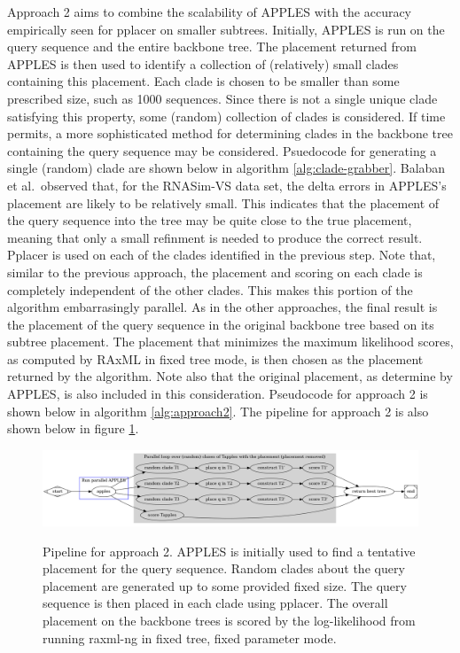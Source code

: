 \documentclass[10pt]{article}
\begin{document}
Approach 2 aims to combine the scalability of APPLES with the accuracy
empirically seen for pplacer on smaller subtrees. Initially, APPLES is
run on the query sequence and the entire backbone tree. The placement
returned from APPLES is then used to identify a collection of
(relatively) small clades containing this placement. Each clade is
chosen to be smaller than some prescribed size, such as 1000 sequences.
Since there is not a single unique clade satisfying this property, some
(random) collection of clades is considered. If time permits, a more
sophisticated method for determining clades in the backbone tree
containing the query sequence may be considered. Psuedocode for
generating a single (random) clade are shown below in algorithm
\ref{alg:clade-grabber}. Balaban et al.~observed that, for the RNASim-VS
data set, the delta errors in APPLES's placement are likely to be
relatively small. This indicates that the placement of the query
sequence into the tree may be quite close to the true placement, meaning
that only a small refinment is needed to produce the correct result.
Pplacer is used on each of the clades identified in the previous step.
Note that, similar to the previous approach, the placement and scoring
on each clade is completely independent of the other clades. This makes
this portion of the algorithm embarrasingly parallel. As in the other
approaches, the final result is the placement of the query sequence in
the original backbone tree based on its subtree placement. The placement
that minimizes the maximum likelihood scores, as computed by RAxML in
fixed tree mode, is then chosen as the placement returned by the
algorithm. Note also that the original placement, as determine by
APPLES, is also included in this consideration. Pseudocode for approach
2 is shown below in algorithm \ref{alg:approach2}.
The pipeline for approach 2 is also shown below in figure \ref{fig:approach2-pipeline}.

\begin{figure}[h]
\centering
\includegraphics[width=\textwidth]{Figs/pipeline2.png}
\label{fig:approach2-pipeline}
\caption{Pipeline for approach 2.
APPLES is initially used to find a tentative placement for the query sequence.
Random clades about the query placement are generated
up to some provided fixed size.
The query sequence is then placed in each clade
using pplacer.
The overall placement on the backbone trees is scored by the log-likelihood
from running raxml-ng in fixed tree, fixed parameter mode.
}
\end{figure}
\end{document}
